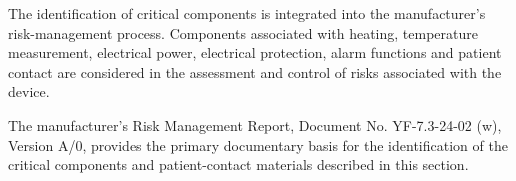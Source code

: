 The identification of critical components is integrated into
the manufacturer's risk-management process. Components associated
with heating, temperature measurement, electrical power,
electrical protection, alarm functions and patient contact are
considered in the assessment and control of risks associated
with the device.

The manufacturer's Risk Management Report, Document No.
YF-7.3-24-02 (w), Version A/0, provides the primary documentary
basis for the identification of the critical components and
patient-contact materials described in this section.


